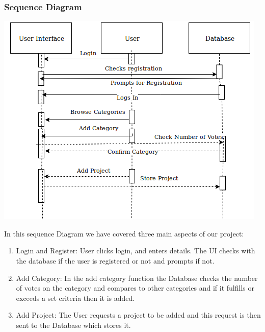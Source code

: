 \documentclass{scrreprt}
\begin{document}
\subsubsection{Sequence Diagram}
\includegraphics[width=\textwidth]{seq.png}

In this sequence Diagram we have covered three main aspects of our project:
\begin{enumerate}
    \item Login and Register: User clicks login, and enters details. The UI checks with the database if the user is registered or not and prompts if not.
    \item Add Category: In the add category function the Database checks the number of votes on the category and compares to other categories and if it fulfills or exceeds a set criteria then it is added.
    \item Add Project: The User requests a project to be added and this request is then sent to the Database which stores it.
\end{enumerate}
\end{document}
